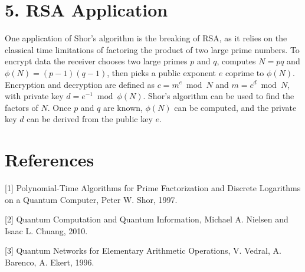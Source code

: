 \documentclass[11pt,a4paper]{article}
\begin{document}
\section{5. RSA Application}
One application of Shor's algorithm is the breaking of RSA, as it relies on the classical time limitations
of factoring the product of two large prime numbers.
To encrypt data the receiver chooses two large primes $p$ and $q$, 
computes $N = pq$ and $\phi(N) = (p-1)(q-1)$, then picks a public exponent $e$ coprime to $\phi(N)$.
Encryption and decryption are defined as
$c = m^e \bmod N$ and $m = c^d \bmod N$, with private key $d = e^{-1} \bmod \phi(N)$.
Shor's algorithm can be used to find the factors of $N$. Once $p$ and $q$ are known, $\phi(N)$ can be computed, and the private key $d$ can be derived from the public key $e$.


\section{References}
[1] Polynomial-Time Algorithms for Prime Factorization and Discrete Logarithms on a Quantum Computer, Peter W. Shor, 1997.

[2] Quantum Computation and Quantum Information, Michael A. Nielsen and Isaac L. Chuang, 2010.

[3] Quantum Networks for Elementary Arithmetic Operations, V. Vedral, A. Barenco, A. Ekert, 1996.
\end{document}
